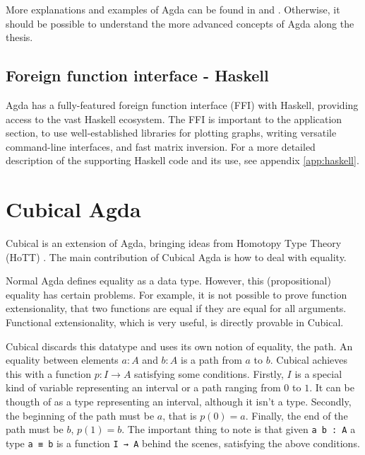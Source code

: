 More explanations and examples of Agda can be found in \cite{agdaWebsite} and \cite{DependentTypesAtWork}. Otherwise, it should be possible to understand the more advanced concepts of Agda along the thesis.

\subsection{Foreign function interface - Haskell}
Agda has a fully-featured foreign function interface (FFI) with Haskell, providing access to the vast Haskell ecosystem. The FFI is important to the application section, to use well-established libraries for plotting graphs, writing versatile command-line interfaces, and fast matrix inversion. For a more detailed description of the supporting Haskell code and its use, see appendix \ref{app:haskell}.





\section{Cubical Agda}
Cubical \cite{cubicalAgdaDocs} is an extension of Agda, bringing ideas from Homotopy Type Theory (HoTT) \cite{hottBook}. The main contribution of Cubical Agda is how to deal with equality.

Normal Agda defines equality as a data type. However, this (propositional) equality has certain problems. For example, it is not possible to prove function extensionality, that two functions are equal if they are equal for all arguments. Functional extensionality, which is very useful, is directly provable in Cubical.

Cubical discards this datatype and uses its own notion of equality, the path. An equality between elements $a : A$ and $b : A$ is a path from $a$ to $b$.
Cubical achieves this with a function $p : I \rightarrow A$ satisfying some conditions. Firstly, $I$ is a special kind of variable representing an interval or a path ranging from $0$ to $1$. It can be thougth of as a type representing an interval, although it isn't a type. Secondly, the beginning of the path must be $a$, that is $p(0)=a$. Finally, the end of the path must be $b$, $p(1)=b$. The important thing to note is that given \texttt{a b : A} a type \texttt{a ≡ b} is a function \texttt{I → A} behind the scenes, satisfying the above conditions. 

